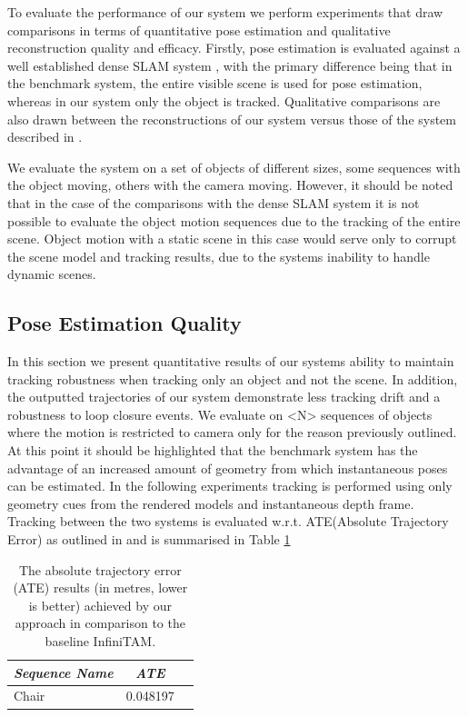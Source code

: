 To evaluate the performance of our system we perform experiments that draw comparisons in terms of quantitative pose estimation and qualitative reconstruction quality and efficacy.
Firstly, pose estimation is evaluated against a well established dense SLAM system \cite{Prisacariu2014}, with the primary difference being that in the benchmark system, the entire 
visible scene is used for pose estimation, whereas in our system only the object is tracked.
Qualitative comparisons are also drawn between the reconstructions of our system versus those of the system described in \cite{Ren2013}.

We evaluate the system on a set of objects of different sizes, some sequences with the object moving, others with the camera moving. However, it should be noted that in the case of the 
comparisons with the dense SLAM system it is not possible to evaluate the object motion sequences due to the tracking of the entire scene. Object motion with a static scene in this case 
would serve only to corrupt the scene model and tracking results, due to the systems inability to handle dynamic scenes.

\subsection{Pose Estimation Quality}
In this section we present quantitative results of our systems ability to maintain tracking robustness when tracking only an object and not the scene. In addition, the outputted trajectories 
of our system demonstrate less tracking drift and a robustness to loop closure events. We evaluate on <N> sequences of objects where the motion is restricted to camera only for the reason 
previously outlined. At this point it should be highlighted that the benchmark system has the advantage of an increased amount of geometry from which instantaneous poses can be estimated.
In the following experiments tracking is performed using only geometry cues from the rendered models and instantaneous depth frame.\\

Tracking between the two systems is evaluated w.r.t. ATE(Absolute Trajectory Error) as outlined in \cite{sturm12iros} and is summarised in Table \ref{ateTable}
\begin{table}[!t]
	{\small
		\begin{center}
			\begin{tabular}{l@{\hskip 1cm} c c}
				\emph{Sequence Name} & \emph{ATE}\\
				\midrule
				\textsf{Chair} & 0.048197\\
			\end{tabular}
		\end{center}
	}
	\caption{The absolute trajectory error (ATE) results (in metres, lower is better) achieved by our approach in comparison to the baseline InfiniTAM.}
	\label{ateTable}
\end{table}

